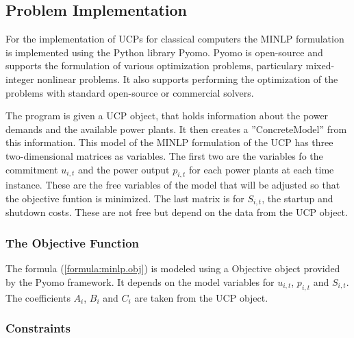 \subsection{Problem Implementation}

For the implementation of UCPs for classical computers
the MINLP formulation is implemented using the Python library Pyomo.
Pyomo is open-source and supports the formulation of various optimization problems,
particulary mixed-integer nonlinear problems.
It also supports performing the optimization of the problems
with standard open-source or commercial solvers.
\cite{hart2011pyomo}

The program is given a UCP object, that holds information
about the power demands and the available power plants.
It then creates a ''ConcreteModel'' from this information.
This model of the MINLP formulation of the UCP
has three two-dimensional matrices as variables.
The first two are the variables fo the commitment $u_{i, t}$
and the power output $p_{i, t}$ for each power plants at each time instance.
These are the free variables of the model that will be adjusted so that the objective funtion is minimized.
The last matrix is for $S_{i, t}$, the startup and shutdown costs.
These are not free but depend on the data from the UCP object.


\subsubsection{The Objective Function}

The formula (\ref{formula:minlp.obj}) is modeled using a Objective object provided by the Pyomo framework.
It depends on the model variables for $u_{i, t}$, $p_{i, t}$ and $S_{i, t}$.
The coefficients $A_i$, $B_i$ and $C_i$ are taken from the UCP object.



\subsubsection{Constraints}

